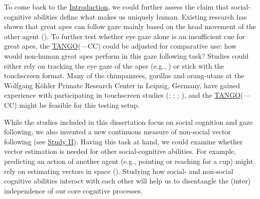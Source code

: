 \documentclass[
]{scrbook}
\begin{document}
To come back to the \hyperref[introduction]{Introduction}, we could further assess the claim that social-cognitive abilities define what makes us uniquely human. Existing research has shown that great apes can follow gaze mainly based on the head movement of the other agent (). To further test whether eye gaze alone is an insufficient cue for great apes, the \hyperref[acronyms_TANGO]{TANGO}(---CC) could be adjusted for comparative use: how would non-human great apes perform in this gaze following task? Studies could either rely on tracking the eye gaze of the apes (e.g., ) or stick with the touchscreen format. Many of the chimpanzees, gorillas and orang-utans at the Wolfgang Köhler Primate Research Center in Leipzig, Germany, have gained experience with participating in touchscreen studies (; ; ; ), and the \hyperref[acronyms_TANGO]{TANGO}(---CC) might be feasible for this testing setup.

While the studies included in this dissertation focus on social cognition and gaze following, we also invented a new continuous measure of non-social vector following (see \hyperref[studyII]{Study II}). Having this task at hand, we could examine whether vector estimation is needed for other social-cognitive abilities. For example, predicting an action of another agent (e.g., pointing or reaching for a cup) might rely on estimating vectors in space (). Studying how social- and non-social cognitive abilities interact with each other will help us to disentangle the (inter) independence of our core cognitive processes.
\end{document}

